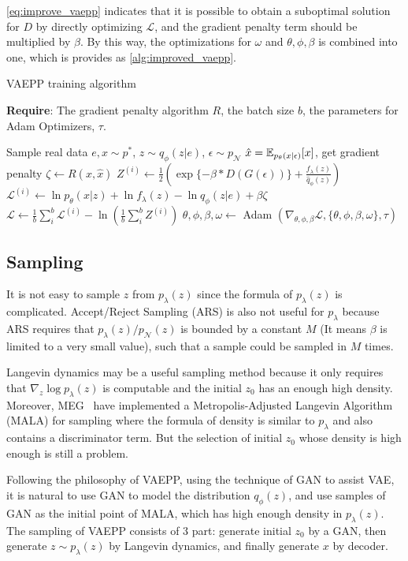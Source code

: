 \cref{eq:improve_vaepp} indicates that it is possible to obtain a suboptimal solution for $D$ by directly optimizing $\mathcal{L}$, and the gradient penalty term should be multiplied by $\beta$. By this way, the optimizations for $\omega$ and $\theta, \phi, \beta$ is combined into one, which is provides as \cref{alg:improved_vaepp}. 
\begin{algorithm}[tb]
\caption{VAEPP training algorithm}
\label{alg:improved_vaepp}
\textbf{Require}: The gradient penalty algorithm $R$, the batch size $b$, the parameters for Adam Optimizers, $\tau$. 

\begin{algorithmic}[1] %
\STATE Sample real data $e, x \sim p^*$, $z \sim q_\phi(z|e)$, $\epsilon \sim p_\mathcal{N}$
\STATE $\hat{x} = \operatorname{\mathbb{E}}_{p_\theta(x|\epsilon)}[x]$, get gradient penalty $\zeta \gets R(x, \hat{x})$ 
\STATE $Z^{(i)} \gets \frac{1}{2}(\exp\{-\beta * D(G(\epsilon))\} + \frac{f_\lambda(z)}{\hat{q}_\phi(z)})$
\STATE $\mathcal{L}^{(i)} \gets \ln p_\theta(x|z) + \ln f_\lambda(z) - \ln q_\phi(z|e) + \beta \zeta$
\ENDFOR
\STATE $\mathcal{L} \gets \frac{1}{b}\sum_{i}^b \mathcal{L}^{(i)} - \ln (\frac{1}{b}\sum_{i}^b Z^{(i)})$
\STATE $\theta, \phi, \beta, \omega \gets $ Adam $(\nabla_{\theta, \phi, \beta} \mathcal{L}, \{\theta, \phi, \beta, \omega\}, \tau)$
\ENDWHILE
\end{algorithmic}
\end{algorithm}

\subsection{Sampling}
It is not easy to sample $z$ from $p_\lambda(z)$ since the formula of $p_\lambda(z)$ is complicated. Accept/Reject Sampling (ARS) is also not useful for $p_\lambda$ because ARS requires that $p_\lambda(z) / p_\mathcal{N}(z)$ is bounded by a constant $M$ (It means $\beta$ is limited to a very small value), such that a sample could be sampled in $M$ times. 

Langevin dynamics may be a useful sampling method because it only requires that $\nabla_z \log p_\lambda(z)$ is computable and the initial $z_0$ has an enough high density. Moreover, MEG~\cite{kumar2019maximum} have implemented a Metropolis-Adjusted Langevin Algorithm (MALA) for sampling where the formula of density is similar to $p_\lambda$ and also contains a discriminator term. But the selection of initial $z_0$ whose density is high enough is still a problem. 

Following the philosophy of VAEPP, \IE using the technique of GAN to assist VAE, it is natural to use GAN to model the distribution $q_\phi(z)$, and use samples of GAN as the initial point of MALA, which has high enough density in $p_\lambda(z)$. The sampling of VAEPP consists of 3 part: generate initial $z_0$ by a GAN, then generate $z \sim p_\lambda(z)$ by Langevin dynamics, and finally generate $x$ by decoder. 


 
 
